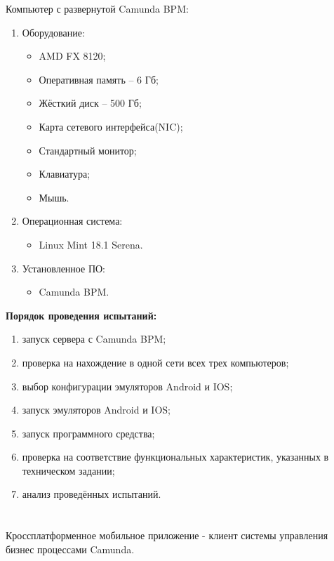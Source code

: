 Компьютер с развернутой Camunda BPM:
\begin{enumerate}
	\item Оборудование:
	\begin{itemize}
		\item AMD FX 8120;
		\item Оперативная память – 6 Гб;
		\item Жёсткий диск – 500 Гб;
		\item Карта сетевого интерфейса(NIC);
		\item Стандартный монитор;
		\item Клавиатура;
		\item Мышь.
	\end{itemize}
\item Операционная система:
\begin{itemize}
	\item Linux Mint 18.1 Serena.
\end{itemize}
\item Установленное ПО:
\begin{itemize}
	\item Camunda BPM.
\end{itemize}
\end{enumerate}
\textbf{Порядок проведения испытаний:}
\begin{enumerate}
	\item запуск сервера с Camunda BPM;
	\item проверка на нахождение в одной сети всех трех компьютеров;
	\item выбор конфигурации эмуляторов Android и IOS;
	\item запуск эмуляторов Android и IOS;
	\item запуск программного средства;
	\item проверка на соответствие функциональных характеристик, указанных в техническом задании;
	\item анализ проведённых испытаний.
\end{enumerate}



\newpage

\chapter{}

\vspace{7em}

\begin{center}
	Кроссплатформенное мобильное приложение - клиент системы управления бизнес процессами Camunda.
\end{center}

